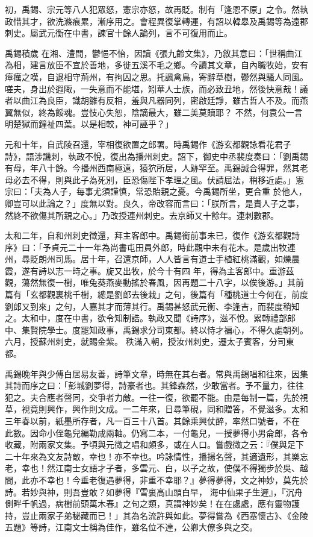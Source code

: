 \begin{pinyinscope}
 初，禹錫、宗元等八人犯眾怒，憲宗亦怒，故再貶。制有「逢恩不原」之令。然執政惜其才，欲洗滌痕累，漸序用之。會程異復掌轉運，有詔以韓皋及禹錫等為遠郡刺史。屬武元衡在中書，諫官十餘人論列，言不可復用而止。



 禹錫積歲
 在湘、澧間，鬱悒不怡，因讀《張九齡文集》，乃敘其意曰：「世稱曲江為相，建言放臣不宜於善地，多徙五溪不毛之鄉。今讀其文章，自內職牧始，安有瘴癘之嘆，自退相守荊州，有拘囚之思。托諷禽鳥，寄辭草樹，鬱然與騷人同風。嗟夫，身出於遐陬，一失意而不能堪，矧華人士族，而必致丑地，然後快意哉！議者以曲江為良臣，識胡雛有反相，羞與凡器同列，密啟廷諍，雖古哲人不及。而燕翼無似，終為餒魂。豈忮心失恕，陰謫最大，雖二美莫贖耶？
 不然，何袁公一言明楚獄而鐘祉四葉。以是相較，神可誣乎？」



 元和十年，自武陵召還，宰相復欲置之郎署。時禹錫作《游玄都觀詠看花君子詩》，語涉譏刺，執政不悅，復出為播州刺史。詔下，御史中丞裴度奏曰：「劉禹錫有母，年八十餘。今播州西南極遠，猿狖所居，人跡罕至。禹錫誠合得罪，然其老母必去不得，則與此子為死別，臣恐傷陛下孝理之風。伏請屈法，稍移近處。」憲宗曰：「夫為人子，每事尤須謹慎，常恐貽親之憂。今禹錫所坐，更合重
 於他人，卿豈可以此論之？」度無以對。良久，帝改容而言曰：「朕所言，是責人子之事，然終不欲傷其所親之心。」乃改授連州刺史。去京師又十餘年。連刺數郡。



 太和二年，自和州刺史徵還，拜主客郎中。禹錫銜前事未已，復作《游玄都觀詩序》曰：「予貞元二十一年為尚書屯田員外郎，時此觀中未有花木。是歲出牧連州，尋貶朗州司馬。居十年，召還京師，人人皆言有道士手植紅桃滿觀，如爍晨霞，遂有詩以志一時之事。旋又出牧，於今十有四
 年，得為主客郎中。重游茲觀，蕩然無復一樹，唯兔葵燕麥動搖於春風，因再題二十八字，以俟後游。」其前篇有「玄都觀裏桃千樹，總是劉郎去後栽」之句，後篇有「種桃道士今何在，前度劉郎又到來」之句，人嘉其才而薄其行。禹錫甚怒武元衡、李逢吉，而裴度稍知之。太和中，度在中書，欲令知制誥。執政又聞《詩序》，滋不悅。累轉禮部郎中、集賢院學士。度罷知政事，禹錫求分司東都。終以恃才褊心，不得久處朝列。六月，授蘇州刺史，就賜金紫。
 秩滿入朝，授汝州刺史，遷太子賓客，分司東都。



 禹錫晚年與少傅白居易友善，詩筆文章，時無在其右者。常與禹錫唱和往來，因集其詩而序之曰：「彭城劉夢得，詩豪者也。其鋒森然，少敢當者。予不量力，往往犯之。夫合應者聲同，交爭者力敵。一往一復，欲罷不能。由是每制一篇，先於視草，視竟則興作，興作則文成。一二年來，日尋筆硯，同和贈答，不覺滋多。太和三年春以前，紙墨所存者，凡一百三十八首。其餘乘興仗醉，率然口號者，不在
 此數。因命小侄龜兒編勒成兩軸。仍寫二本，一付龜兒，一授夢得小男侖郎，各令收藏，附兩家文集。予頃與元微之唱和頗多，或在人口。嘗戲微之云：『僕與足下二十年來為文友詩敵，幸也！亦不幸也。吟詠情性，播揚名聲，其適遺形，其樂忘老，幸也！然江南士女語才子者，多雲元、白，以子之故，使僕不得獨步於吳、越間，此亦不幸也！今垂老復遇夢得，非重不幸耶？』夢得夢得，文之神妙，莫先於詩。若妙與神，則吾豈敢？如夢得『雪裏高山頭白早，
 海中仙果子生遲』，『沉舟側畔千帆過，病樹前頭萬木春』之句之類，真謂神妙矣！在在處處，應有靈物護持，豈止兩家子弟秘藏而已！」其為名流許與如此。夢得嘗為《西塞懷古》、《金陵五題》等詩，江南文士稱為佳作，雖名位不達，公卿大僚多與之交。




\end{pinyinscope}
